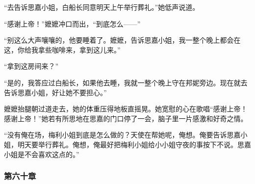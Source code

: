 \par “去告诉思嘉小姐，白船长同意明天上午举行葬礼。”她低声说道。
\par “感谢上帝！”嬷嬷冲口而出，“到底怎么——”
\par “别这么大声嚷嚷的，他要睡着了。嬷嬷，告诉思嘉小姐，我一整个晚上都会在这，你给我拿些咖啡来，拿到这儿来。”
\par “拿到这房间来？”
\par “是的，我答应过白船长，如果他去睡，我就一整个晚上守在邦妮旁边。现在就去告诉思嘉小姐，好让她不要担心。”
\par 嬷嬷抬腿朝过道走去，她的体重压得地板直摇晃。她宽慰的心在歌唱“感谢上帝！感谢上帝！”她若有所思地在思嘉的门口停了一会，脑子里一片感激和好奇之情。
\par “没有俺在场，梅利小姐到底是怎么做的？天使在帮她呢，俺想。俺要告诉思嘉小姐，明天要举行葬礼。俺想，俺最好把梅利小姐给小小姐守夜的事按下不说。思嘉小姐是不会喜欢这点的。”

\subsubsection{第六十章}

